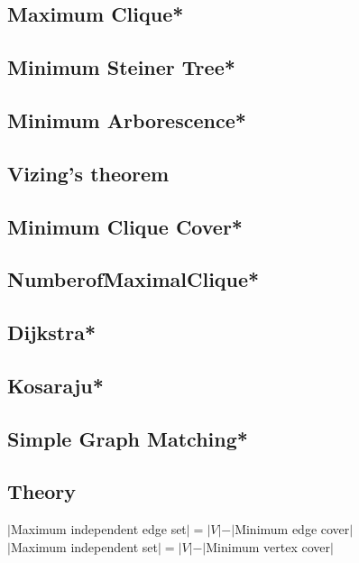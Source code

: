 \subsection{Maximum Clique*} %

\subsection{Minimum Steiner Tree*} %

\subsection{Minimum Arborescence*} %

\subsection{Vizing's theorem}

\subsection{Minimum Clique Cover*} %

\subsection{NumberofMaximalClique*} %

\subsection{Dijkstra*}

\subsection{Kosaraju*}

\subsection{Simple Graph Matching*}

\subsection{Theory}
\begin{footnotesize}
$|$Maximum independent edge set$|=|V|-|$Minimum edge cover$|$\\
$|$Maximum independent set$|=|V|-|$Minimum vertex cover$|$\\
\end{footnotesize}


